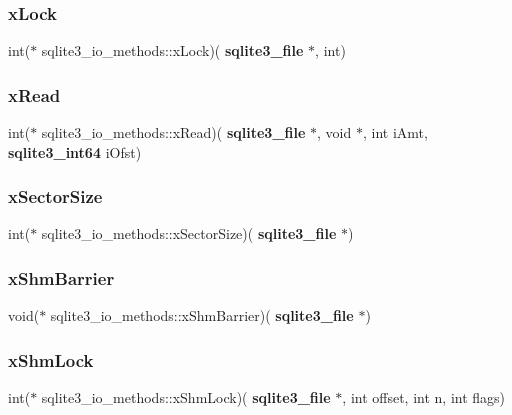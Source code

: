 \subsubsection{xLock}
{\footnotesize\ttfamily int($\ast$ sqlite3\+\_\+io\+\_\+methods\+::x\+Lock)(\textbf{ sqlite3\+\_\+file} $\ast$, int)}

\mbox{\label{structsqlite3__io__methods_a19870694752f65e8738d89d871d0ca7f}} 
\subsubsection{xRead}
{\footnotesize\ttfamily int($\ast$ sqlite3\+\_\+io\+\_\+methods\+::x\+Read)(\textbf{ sqlite3\+\_\+file} $\ast$, void $\ast$, int i\+Amt, \textbf{ sqlite3\+\_\+int64} i\+Ofst)}

\mbox{\label{structsqlite3__io__methods_a8436e6eeac404b35057be97f3c2b5c3d}} 
\subsubsection{xSectorSize}
{\footnotesize\ttfamily int($\ast$ sqlite3\+\_\+io\+\_\+methods\+::x\+Sector\+Size)(\textbf{ sqlite3\+\_\+file} $\ast$)}

\mbox{\label{structsqlite3__io__methods_aedf4a59fa25ad33e0625a2aa0f6f2184}} 
\subsubsection{xShmBarrier}
{\footnotesize\ttfamily void($\ast$ sqlite3\+\_\+io\+\_\+methods\+::x\+Shm\+Barrier)(\textbf{ sqlite3\+\_\+file} $\ast$)}

\mbox{\label{structsqlite3__io__methods_a58f4a6b0df86440029cc5fa1b65b1b4e}} 
\subsubsection{xShmLock}
{\footnotesize\ttfamily int($\ast$ sqlite3\+\_\+io\+\_\+methods\+::x\+Shm\+Lock)(\textbf{ sqlite3\+\_\+file} $\ast$, int offset, int n, int flags)}

